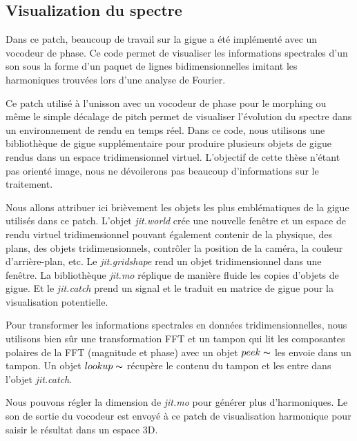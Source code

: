 \subsection{Visualization du spectre}
    
    Dans ce patch, beaucoup de travail sur la gigue a été implémenté avec un vocodeur de phase. Ce code permet de visualiser les informations spectrales d’un son sous la forme d’un paquet de lignes bidimensionnelles imitant les harmoniques trouvées lors d’une analyse de Fourier.

    Ce patch utilisé à l'unisson avec un vocodeur de phase pour le morphing ou même le simple décalage de pitch permet de visualiser l'évolution du spectre dans un environnement de rendu en temps réel. Dans ce code, nous utilisons une bibliothèque de gigue supplémentaire pour produire plusieurs objets de gigue rendus dans un espace tridimensionnel virtuel. L'objectif de cette thèse n'étant pas orienté image, nous ne dévoilerons pas beaucoup d'informations sur le traitement.

    Nous allons attribuer ici brièvement les objets les plus emblématiques de la gigue utilisés dans ce patch. L'objet \textit{jit.world} crée une nouvelle fenêtre et un espace de rendu virtuel tridimensionnel pouvant également contenir de la physique, des plans, des objets tridimensionnels, contrôler la position de la caméra, la couleur d'arrière-plan, etc. Le \textit{jit.gridshape} rend un objet tridimensionnel dans une fenêtre. La bibliothèque \textit{jit.mo} réplique de manière fluide les copies d’objets de gigue. Et le \textit{jit.catch} prend un signal et le traduit en matrice de gigue pour la visualisation potentielle.

    Pour transformer les informations spectrales en données tridimensionnelles, nous utilisons bien sûr une transformation FFT et un tampon qui lit les composantes polaires de la FFT (magnitude et phase) avec un objet $ peek \thicksim $ les envoie dans un tampon. Un objet $ lookup \thicksim $ récupère le contenu du tampon et les entre dans l'objet \textit{jit.catch}.

    Nous pouvons régler la dimension de \textit{jit.mo} pour générer plus d'harmoniques. Le son de sortie du vocodeur est envoyé à ce patch de visualisation harmonique pour saisir le résultat dans un espace 3D.


